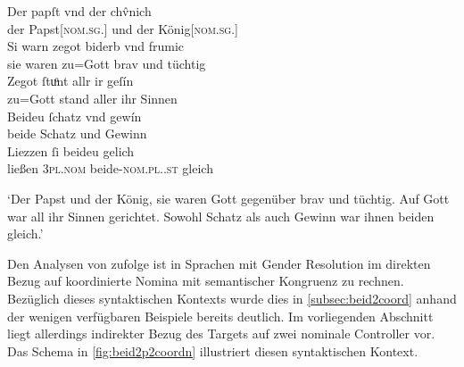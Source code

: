 \begin{exe}
\ex\label{ex:papstkoenig5} %
	\gll Der papſt vnd der chv̂nich \\
		der Papst[\textsc{nom.sg.\MascM}] und der König[\textsc{nom.sg.\MascM}] \\
\sn \gll Si warn zegot biderb vnd frumic \\
		sie waren {zu=Gott} brav und tüchtig \\
\sn \gll Zegot ſtuͦnt allr ir geſín \\
		{zu=Gott} stand aller ihr Sinnen \\
\sn \gll Beideu ſchatz vnd gewín \\
		beide Schatz und Gewinn \\
\sn \gll Liezzen ſi beideu gelich \\
		ließen \textsc{3pl\subM.nom} beide-\textsc{nom.pl.\NeutM.st} gleich \\
	\begin{taggedline}{\parencites[\pno~17\vb, 30--34]{kc:B1}[vgl. abweichend][6110--6113]{schroeder1895}}
	\trans `Der Papst und der König, sie waren Gott gegenüber brav und
		tüchtig. Auf Gott war all ihr Sinnen gerichtet. Sowohl Schatz als auch
		Gewinn war ihnen beiden gleich.'
	\end{taggedline}
\end{exe}

Den Analysen von \citet{wechsler2009,wechslerzlatic2003} zufolge ist in
Sprachen mit Gender Resolution im direkten Bezug auf koordinierte Nomina mit
semantischer Kongruenz zu rechnen. Bezüglich dieses syntaktischen Kontexts
wurde dies in \cref{subsec:beid2coord} anhand der wenigen verfügbaren Beispiele
bereits deutlich. Im vorliegenden Abschnitt liegt allerdings indirekter
Bezug des Targets  auf zwei nominale Controller vor. Das Schema
in \cref{fig:beid2p2coordn} illustriert diesen syntaktischen Kontext.

